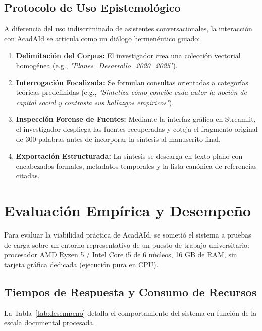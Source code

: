 \documentclass[12pt,a4paper]{article}
\begin{document}
\subsection{Protocolo de Uso Epistemológico}
A diferencia del uso indiscriminado de asistentes conversacionales, la interacción con AcadAId se articula como un diálogo hermenéutico guiado:
\begin{enumerate}
    \item \textbf{Delimitación del Corpus:} El investigador crea una colección vectorial homogénea (e.g., \textit{"Planes\_Desarrollo\_2020\_2025"}).
    \item \textbf{Interrogación Focalizada:} Se formulan consultas orientadas a categorías teóricas predefinidas (e.g., \textit{"Sintetiza cómo concibe cada autor la noción de capital social y contrasta sus hallazgos empíricos"}).
    \item \textbf{Inspección Forense de Fuentes:} Mediante la interfaz gráfica en Streamlit, el investigador despliega las fuentes recuperadas y coteja el fragmento original de 300 palabras antes de incorporar la síntesis al manuscrito final.
    \item \textbf{Exportación Estructurada:} La síntesis se descarga en texto plano con encabezados formales, metadatos temporales y la lista canónica de referencias citadas.
\end{enumerate}

\section{Evaluación Empírica y Desempeño}
\label{sec:evaluacion}

Para evaluar la viabilidad práctica de AcadAId, se sometió el sistema a pruebas de carga sobre un entorno representativo de un puesto de trabajo universitario: procesador AMD Ryzen 5 / Intel Core i5 de 6 núcleos, 16 GB de RAM, sin tarjeta gráfica dedicada (ejecución pura en CPU).

\subsection{Tiempos de Respuesta y Consumo de Recursos}
La Tabla~\ref{tab:desempeno} detalla el comportamiento del sistema en función de la escala documental procesada.
\end{document}
